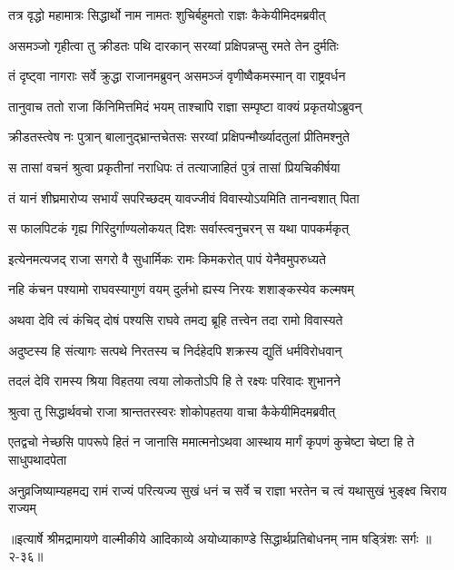 \twolineshloka
{तत्र वृद्धो महामात्रः सिद्धार्थो नाम नामतः}
{शुचिर्बहुमतो राज्ञः कैकेयीमिदमब्रवीत्} %

\twolineshloka
{असमञ्जो गृहीत्वा तु क्रीडतः पथि दारकान्}
{सरय्वां प्रक्षिपन्नप्सु रमते तेन दुर्मतिः} %

\twolineshloka
{तं दृष्ट्वा नागराः सर्वे क्रुद्धा राजानमब्रुवन्}
{असमञ्जं वृणीष्वैकमस्मान् वा राष्ट्रवर्धन} %

\twolineshloka
{तानुवाच ततो राजा किंनिमित्तमिदं भयम्}
{ताश्चापि राज्ञा सम्पृष्टा वाक्यं प्रकृतयोऽब्रुवन्} %

\twolineshloka
{क्रीडतस्त्वेष नः पुत्रान् बालानुद्भ्रान्तचेतसः}
{सरय्वां प्रक्षिपन्मौर्ख्यादतुलां प्रीतिमश्नुते} %

\twolineshloka
{स तासां वचनं श्रुत्वा प्रकृतीनां नराधिपः}
{तं तत्याजाहितं पुत्रं तासां प्रियचिकीर्षया} %

\twolineshloka
{तं यानं शीघ्रमारोप्य सभार्यं सपरिच्छदम्}
{यावज्जीवं विवास्योऽयमिति तानन्वशात् पिता} %

\twolineshloka
{स फालपिटकं गृह्य गिरिदुर्गाण्यलोकयत्}
{दिशः सर्वास्त्वनुचरन् स यथा पापकर्मकृत्} %

\twolineshloka
{इत्येनमत्यजद् राजा सगरो वै सुधार्मिकः}
{रामः किमकरोत् पापं येनैवमुपरुध्यते} %

\twolineshloka
{नहि कंचन पश्यामो राघवस्यागुणं वयम्}
{दुर्लभो ह्यस्य निरयः शशाङ्कस्येव कल्मषम्} %

\twolineshloka
{अथवा देवि त्वं कंचिद् दोषं पश्यसि राघवे}
{तमद्य ब्रूहि तत्त्वेन तदा रामो विवास्यते} %

\twolineshloka
{अदुष्टस्य हि संत्यागः सत्पथे निरतस्य च}
{निर्दहेदपि शक्रस्य द्युतिं धर्मविरोधवान्} %

\twolineshloka
{तदलं देवि रामस्य श्रिया विहतया त्वया}
{लोकतोऽपि हि ते रक्ष्यः परिवादः शुभानने} %

\twolineshloka
{श्रुत्वा तु सिद्धार्थवचो राजा श्रान्ततरस्वरः}
{शोकोपहतया वाचा कैकेयीमिदमब्रवीत्} %

\twolineshloka
{एतद्वचो नेच्छसि पापरूपे हितं न जानासि ममात्मनोऽथवा}
{आस्थाय मार्गं कृपणं कुचेष्टा चेष्टा हि ते साधुपथादपेता} %

\twolineshloka
{अनुव्रजिष्याम्यहमद्य रामं राज्यं परित्यज्य सुखं धनं च}
{सर्वे च राज्ञा भरतेन च त्वं यथासुखं भुङ्क्ष्व चिराय राज्यम्} %


॥इत्यार्षे श्रीमद्रामायणे वाल्मीकीये आदिकाव्ये अयोध्याकाण्डे सिद्धार्थप्रतिबोधनम् नाम षड्त्रिंशः सर्गः ॥२-३६॥
